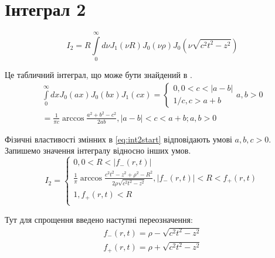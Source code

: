 \section{Інтеграл 2}
%
\begin{equation} \label{eq:int2start}
I_2 = R \int \limits_{0}^{\infty} d \nu J_1 \left( \nu R \right) 
J_0 \left( \nu \rho \right) J_0 \left( \nu \sqrt{c^2t^2 - z^2} \right)
\end{equation}

Це табличний інтеграл, що може бути знайдений в 
\cite[ст. 228]{imp:SpecFunc1983}.
%
\begin{equation} \begin{aligned} \label{eq:intJ0J0J1tabel}
\int \limits_{0}^{\infty} d x J_0 \left( ax \right) 
J_0 \left( bx \right) J_1 \left( cx \right) = \begin{cases}
0, 0 < c < | a - b | \\ 
1/c, c > a + b
\end{cases} a, b > 0 \\
= \frac{1}{\pi c} \arccos \frac{a^2 + b^2 - c^2}{2ab},
| a - b | < c < a + b; a,b > 0
\end{aligned} \end{equation}

Фізичні властивості змінних в \eqref{eq:int2start} відповідають умові 
$ a,b,c > 0 $. Запишемо значення інтегралу відносно інших умов.
%
\begin{equation}
I_2 = \begin{cases}
0, 0 < R < | f_{-} \left( r, t \right) | \\
\frac{1}{\pi} \arccos \frac{c^2t^2 - z^2 + \rho^2 - R^2}
{2 \rho \sqrt{c^2t^2 - z^2}}, | f_{-} \left( r, t \right) | < R < 
f_{+} \left( r, t \right) \\ 1, f_{+} \left( r, t \right) < R \\
\end{cases}
\end{equation}

Тут для спрощення введено наступні переозначення:
%
\begin{equation*} \begin{aligned}
f_{-} \left( r, t \right) = \rho - \sqrt{c^2t^2 - z^2} \\
f_{+} \left( r, t \right) = \rho + \sqrt{c^2t^2 - z^2}
\end{aligned} \end{equation*}

